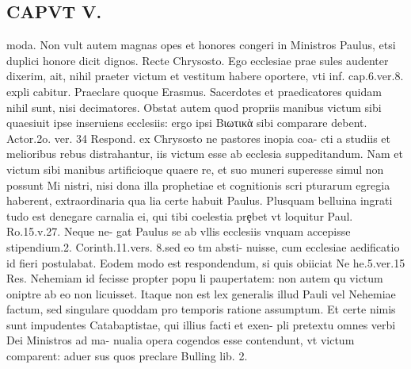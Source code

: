 \documentclass{article}
\begin{document}
\begin{pages}
\section*{CAPVT  V. }
\marginpar{[ p.307 ]}\pstart moda. Non vult autem magnas opes et honores congeri in Ministros Paulus, etsi duplici honore dicit dignos. Recte Chrysosto. Ego ecclesiae prae sules audenter dixerim, ait, nihil praeter victum et vestitum habere oportere, vti inf. cap.6.ver.8. expli cabitur. Praeclare quoque Erasmus. Sacerdotes et praedicatores quidam nihil sunt, nisi decimatores. Obstat autem quod propriis manibus victum sibi quaesiuit ipse inseruiens ecclesiis: ergo ipsi Βιωτικὰ sibi comparare debent. Actor.2o. ver. 34 Respond. ex Chrysosto ne pastores inopia coa- cti a studiis et melioribus rebus distrahantur, iis victum esse ab ecclesia suppeditandum. Nam et victum sibi manibus artificioque quaere re, et suo muneri superesse simul non possunt Mi nistri, nisi dona illa prophetiae et cognitionis scri pturarum egregia haberent, extraordinaria qua lia certe habuit Paulus. Plusquam belluina ingrati tudo est denegare carnalia ei, qui tibi coelestia prȩbet vt loquitur Paul. Ro.15.v.27. Neque ne- gat Paulus se ab vllis ecclesiis vnquam accepisse stipendium.2. Corinth.11.vers. 8.sed eo tm absti- nuisse, cum ecclesiae aedificatio id fieri postulabat. Eodem modo est respondendum, si quis obiiciat Ne he.5.ver.15 Res. Nehemiam id fecisse propter popu li paupertatem: non autem qu victum oniptre ab eo non licuisset. Itaque non est lex generalis illud Pauli vel Nehemiae factum, sed singulare quoddam pro temporis ratione assumptum. Et certe nimis sunt impudentes Catabaptistae, qui illius facti et exen- pli pretextu omnes verbi Dei Ministros ad ma- nualia opera cogendos esse contendunt, vt victum comparent: aduer sus quos preclare Bulling lib. 2.  \pend

\end{pages}
\end{document}
